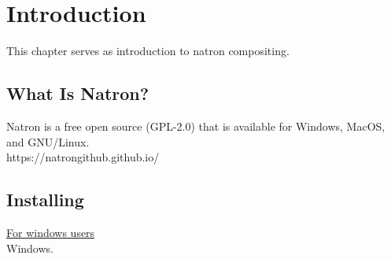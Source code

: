 
\chapter{Introduction}
This chapter serves as introduction to natron compositing.

\section{What Is Natron?}
Natron is a free open source (GPL-2.0) that is available for Windows,
MacOS, and GNU/Linux. \\
https://natrongithub.github.io/

\section{Installing}
{\underline{\HUGE For windows users}} \\
Windows.

